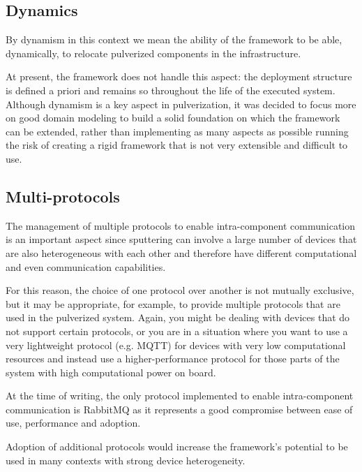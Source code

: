 \subsection{Dynamics}
\label{sec:dynamics}

By dynamism in this context we mean the ability of the framework to be able, dynamically, to relocate pulverized components in the infrastructure.

At present, the framework does not handle this aspect: the deployment structure is defined a priori and remains so throughout the life of the
executed system. Although dynamism is a key aspect in pulverization, it was decided to focus more on good domain modeling to build a solid foundation
on which the framework can be extended, rather than implementing as many aspects as possible running the risk of creating a rigid framework that is
not very extensible and difficult to use.

\subsection{Multi-protocols}
\label{sec:multi-protocols}

The management of multiple protocols to enable intra-component communication is an important aspect since sputtering can involve a large number of devices that are also heterogeneous with each other and therefore have different computational and even communication capabilities.

For this reason, the choice of one protocol over another is not mutually exclusive, but it may be appropriate, for example, to provide
multiple protocols that are used in the pulverized system. Again, you might be dealing with devices that do not support certain protocols, or you are
in a situation where you want to use a very lightweight protocol (e.g. MQTT) for devices with very low computational resources and instead use a
higher-performance protocol for those parts of the system with high computational power on board.

At the time of writing, the only protocol implemented to enable intra-component communication is RabbitMQ as it represents a good compromise between
ease of use, performance and adoption.

Adoption of additional protocols would increase the framework's potential to be used in many contexts with strong device heterogeneity.